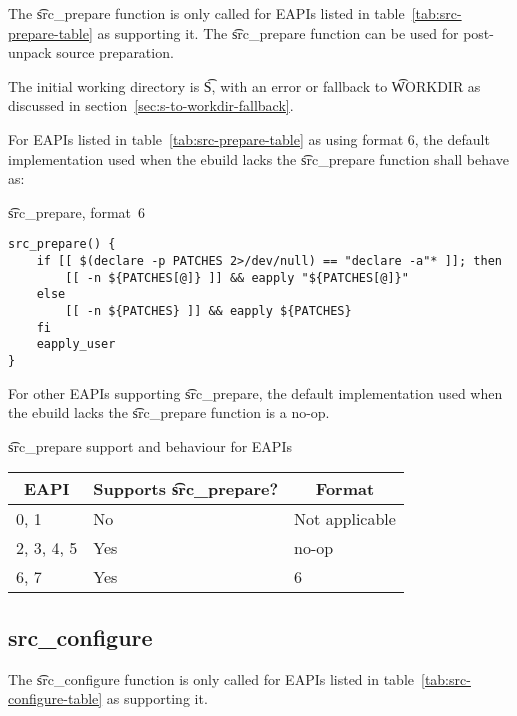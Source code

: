  The \t{src_prepare} function is only called for EAPIs listed in
table~\ref{tab:src-prepare-table} as supporting it. The \t{src_prepare} function can be used for
post-unpack source preparation.

The initial working directory is \t{S}, with an error or fallback to \t{WORKDIR} as discussed in
section~\ref{sec:s-to-workdir-fallback}.

 For EAPIs listed in table~\ref{tab:src-prepare-table} as using format
6, the default implementation used when the ebuild lacks the \t{src_prepare} function shall behave
as:

\begin{listing}[H]
\caption{\t{src_prepare}, format~6}
\begin{verbatim}
src_prepare() {
    if [[ $(declare -p PATCHES 2>/dev/null) == "declare -a"* ]]; then
        [[ -n ${PATCHES[@]} ]] && eapply "${PATCHES[@]}"
    else
        [[ -n ${PATCHES} ]] && eapply ${PATCHES}
    fi
    eapply_user
}
\end{verbatim}
\end{listing}

For other EAPIs supporting \t{src_prepare}, the default implementation used when the ebuild lacks
the \t{src_prepare} function is a no-op.

\begin{centertable}{\t{src_prepare} support and behaviour for EAPIs}
    \label{tab:src-prepare-table}
    \begin{tabular}{lll}
      \toprule
      \multicolumn{1}{c}{\textbf{EAPI}} &
      \multicolumn{1}{c}{\textbf{Supports \t{src_prepare}?}} &
      \multicolumn{1}{c}{\textbf{Format}} \\
      \midrule
      0, 1              & No  & Not applicable \\
      2, 3, 4, 5        & Yes & no-op          \\
      6, 7              & Yes & 6              \\
      \bottomrule
    \end{tabular}
\end{centertable}

\subsection{src_configure}

 The \t{src_configure} function is only called for EAPIs listed in
table~\ref{tab:src-configure-table} as supporting it.

